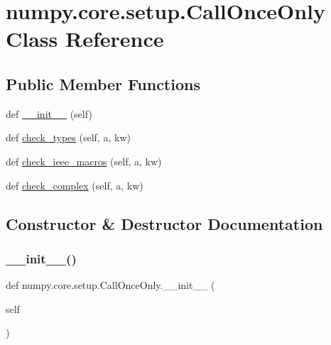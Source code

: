\hypertarget{classnumpy_1_1core_1_1setup_1_1CallOnceOnly}{}\section{numpy.\+core.\+setup.\+Call\+Once\+Only Class Reference}
\label{classnumpy_1_1core_1_1setup_1_1CallOnceOnly}
\subsection*{Public Member Functions}
\begin{DoxyCompactItemize}
\item 
def \hyperlink{classnumpy_1_1core_1_1setup_1_1CallOnceOnly_a8dc95230c1525ff822be5b0532e5eb79}{\+\_\+\+\_\+init\+\_\+\+\_\+} (self)
\item 
def \hyperlink{classnumpy_1_1core_1_1setup_1_1CallOnceOnly_adaa35b69ddf8a7c49dbf4e1d79c922c6}{check\+\_\+types} (self, a, kw)
\item 
def \hyperlink{classnumpy_1_1core_1_1setup_1_1CallOnceOnly_a86c6903a9202b101d5b492e6a456fd75}{check\+\_\+ieee\+\_\+macros} (self, a, kw)
\item 
def \hyperlink{classnumpy_1_1core_1_1setup_1_1CallOnceOnly_a7221773ecc4ff5329b85894f493518d5}{check\+\_\+complex} (self, a, kw)
\end{DoxyCompactItemize}


\subsection{Constructor \& Destructor Documentation}
\mbox{\label{classnumpy_1_1core_1_1setup_1_1CallOnceOnly_a8dc95230c1525ff822be5b0532e5eb79}} 
\subsubsection{\texorpdfstring{\+\_\+\+\_\+init\+\_\+\+\_\+()}{\_\_init\_\_()}}
{\footnotesize\ttfamily def numpy.\+core.\+setup.\+Call\+Once\+Only.\+\_\+\+\_\+init\+\_\+\+\_\+ (\begin{DoxyParamCaption}\item[{}]{self }\end{DoxyParamCaption})}



